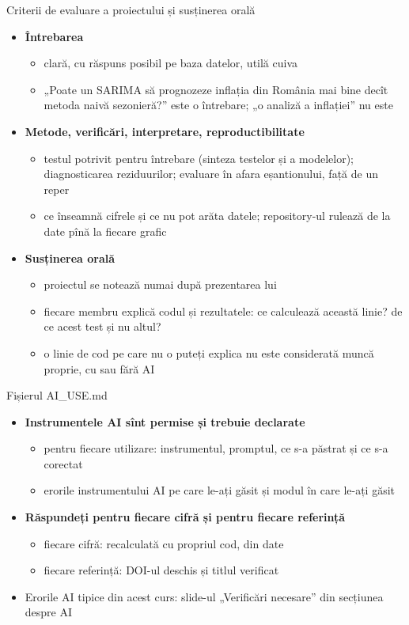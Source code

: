 \begin{frame}{Criterii de evaluare a proiectului și susținerea orală}
\itemsize{\small}
\begin{itemize}
    \item \textbf{Întrebarea}
    \begin{itemize}
        \item clară, cu răspuns posibil pe baza datelor, utilă cuiva
        \item „Poate un SARIMA să prognozeze inflația din România mai bine decît metoda naivă sezonieră?” este o întrebare; „o analiză a inflației” nu este
    \end{itemize}
    \item \textbf{Metode, verificări, interpretare, reproductibilitate}
    \begin{itemize}
        \item testul potrivit pentru întrebare (sinteza testelor și a modelelor); diagnosticarea reziduurilor; evaluare în afara eșantionului, față de un reper
        \item ce înseamnă cifrele și ce nu pot arăta datele; repository-ul rulează de la date pînă la fiecare grafic
    \end{itemize}
    \item \textbf{Susținerea orală}
    \begin{itemize}
        \item proiectul se notează numai după prezentarea lui
        \item fiecare membru explică codul și rezultatele: ce calculează această linie? de ce acest test și nu altul?
        \item o linie de cod pe care nu o puteți explica nu este considerată muncă proprie, cu sau fără AI
    \end{itemize}
\end{itemize}
\end{frame}

\begin{frame}{Fișierul AI\_USE.md}
\itemsize{\small}
\begin{itemize}
    \item \textbf{Instrumentele AI sînt permise și trebuie declarate}
    \begin{itemize}
        \item pentru fiecare utilizare: instrumentul, promptul, ce s-a păstrat și ce s-a corectat
        \item erorile instrumentului AI pe care le-ați găsit și modul în care le-ați găsit
    \end{itemize}
    \item \textbf{Răspundeți pentru fiecare cifră și pentru fiecare referință}
    \begin{itemize}
        \item fiecare cifră: recalculată cu propriul cod, din date
        \item fiecare referință: DOI-ul deschis și titlul verificat
    \end{itemize}
    \item Erorile AI tipice din acest curs: slide-ul „Verificări necesare” din secțiunea despre AI
\end{itemize}
\end{frame}

